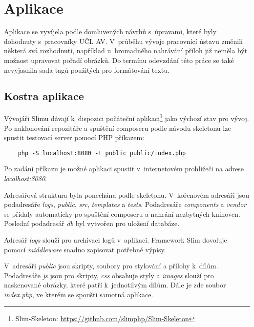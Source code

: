             
            
    \section{Aplikace}
    
        Aplikace se vyvíjela podle domluvených návrhů s~úpravami, které byly dohodnuty s~pracovníky UČL AV. V~průběhu vývoje pracovnící ústavu změnili některá svá rozhodnutí, například u~hromadného nahrávání příloh již neměla být možnost upravovat pořadí obrázků. Do termínu odevzdání této práce se také nevyjasnila sada tagů použitých pro formátování textu.
        \subsection{Kostra aplikace}
            Vývojáři Slimu dávají k~dispozici počáteční aplikaci\footnote{Slim-Skeleton: \url{https://github.com/slimphp/Slim-Skeleton}} jako výchozí stav pro vývoj. Po naklonování repozitáře a spuštění composeru podle návodu skeletonu lze spustit testovací server pomocí PHP příkazem:
            \begin{lstlisting}
    php -S localhost:8080 -t public public/index.php
            \end{lstlisting}
            Po zadání příkazu je možné aplikaci spustit v~internetovém prohlížeči na adrese \textit{localhost:8080}.
            
            Adresářová struktura byla ponechána podle skeletonu. V~kořenovém adresáři jsou podadresáře \textit{logs}, \textit{public}, \textit{src}, \textit{templates} a \textit{tests}. Podadresáře \textit{components} a \textit{vendor} se přidaly automaticky po spuštění composeru a nahrání nezbytných knihoven. Poslední podadresář \textit{db} byl vytvořen pro uložení databáze.

            Adresář \textit{logs} slouží pro archivaci logů v~aplikaci. Framework Slim dovoluje pomocí \textit{middleware} snadno zapisovat potřebné výpisy.
            
            V~adresáři \textit{public} jsou skripty, soubory pro stylování a přílohy k~dílům. Podadresáře \textit{js} jsou pro skripty, \textit{css} obsahuje styly a \textit{images} slouží pro naskenované obrázky, které patří k~jednotilvým dílům. Dále je zde soubor \textit{index.php}, ve kterém se spouští samotná aplikace.
            
